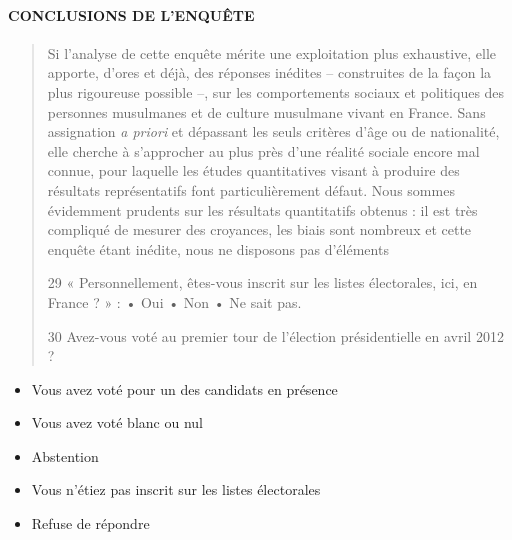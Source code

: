 \hypertarget{conclusions-de-lenquuxeate}{%
\paragraph{CONCLUSIONS DE L'ENQUÊTE}\label{conclusions-de-lenquuxeate}}

\begin{quote}
Si l'analyse de cette enquête mérite une exploitation plus exhaustive,
elle apporte, d'ores et déjà, des réponses inédites -- construites de la
façon la plus rigoureuse possible --, sur les comportements sociaux et
politiques des personnes musulmanes et de culture musulmane vivant en
France. Sans assignation \emph{a priori} et dépassant les seuls critères
d'âge ou de nationalité, elle cherche à s'approcher au plus près d'une
réalité sociale encore mal connue, pour laquelle les études
quantitatives visant à produire des résultats représentatifs font
particulièrement défaut. Nous sommes évidemment prudents sur les
résultats quantitatifs obtenus : il est très compliqué de mesurer des
croyances, les biais sont nombreux et cette enquête étant inédite, nous
ne disposons pas d'éléments

29 « Personnellement, êtes-vous inscrit sur les listes électorales, ici,
en France ? » : • Oui • Non • Ne sait pas.

30 Avez-vous voté au premier tour de l'élection présidentielle en avril
2012 ?
\end{quote}

\begin{itemize}
\item
  Vous avez voté pour un des candidats en présence
\item
  Vous avez voté blanc ou nul
\item
  Abstention
\item
  Vous n'étiez pas inscrit sur les listes électorales
\item
  Refuse de répondre
\end{itemize}

